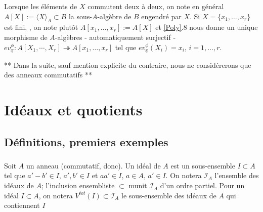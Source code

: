 \documentclass[a4paper, 12pt]{amsart}
\begin{document}
\noindent Lorsque les \'el\'ements de $X$ commutent deux \`a deux, on note en g\'en\'eral $A[X]:=\langle X\rangle_A \subset B$ la sous-$A$-alg\`ebre de $B$ engendr\'e par $X$. Si  $X=\lbrace x_1,\dots,x_r\rbrace $ est fini, , on note plut\^ot $A[x_1,\dots,x_r]:=A[X]$ et  \ref{Poly}.8  nous donne un unique morphisme de $A$-alg\`ebres - automatiquement  surjectif - $ev_{\underline{x}}^\phi:A[X_1,\cdots, X_r]\twoheadrightarrow A[x_1,\dots, x_r] $ tel que $ev^\phi_{\underline{x}}(X_i)=x_i$, $i=1,\dots, r$. \\

 
 
 \begin{center} **  Dans la suite,  sauf mention explicite du contraire, nous ne consid\'ererons que des anneaux commutatifs **\\\end{center}
 

 
\section{Id\'eaux et quotients}\label{Ideaux}
\subsection{D\'efinitions, premiers exemples}
\subsubsection{}Soit $A$ un anneau (commutatif, donc). Un id\'eal de  $A$ est un sous-ensemble $I\subset A$ tel que $a'-b'\in I$,  $a',b'\in I$ et $aa'\in I$, $a\in A$, $a'\in I$. On notera $\mathcal{I}_A$ l'ensemble des id\'eaux de $A$; l'inclusion ensembliste $\subset$ munit $\mathcal{I}_A$ d'un ordre partiel. Pour un id\'eal $I\subset A$, on notera $V^{tot}(I)\subset \mathcal{I}_A$ le sous-ensemble des id\'eaux de $A$ qui contiennent $I$\\
\end{document}
